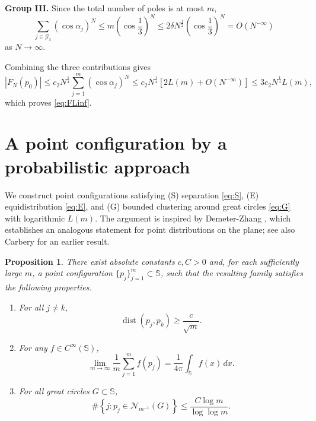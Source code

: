\documentclass[12pt,reqno]{amsart}
\DeclareMathOperator{\dist}{dist}
\newcommand{\Gc}{\mathcal{G}}
\newcommand{\Nc}{\mathcal{N}}
\newcommand{\Sb}{\mathbb{S}}
\theoremstyle{plain}
\newtheorem{prop}[thm]{Proposition}
\theoremstyle{definition}
\theoremstyle{remark}
\numberwithin{equation}{section}
\begin{document}
\textbf{Group III.} Since the total number of poles is at most $m$,
$$\sum_{j\in\Gc_3}\left(\cos\alpha_j\right)^N\le m\left(\cos\frac13\right)^N\le2\delta N^\frac12\left(\cos\frac13\right)^N=O\left(N^{-\infty}\right)$$
as $N\to\infty$.

Combining the three contributions gives
$$\left|F_N\left(p_0\right)\right|\le c_2N^\frac14\sum_{j=1}^m\left(\cos\alpha_j\right)^N\le c_2N^\frac14\left[2L(m)+O\left(N^{-\infty}\right)\right]\le 3c_2N^\frac14L(m),$$
which proves \eqref{eq:FLinf}.


\appendix
\section{A point configuration by a probabilistic approach}\label{sec:prob}
We construct point configurations satisfying (S) separation \eqref{eq:S}, (E) equidistribution \eqref{eq:E}, and (G) bounded clustering around great circles \eqref{eq:G} with logarithmic $L(m)$. The argument is inspired by Demeter-Zhang \cite[Proposition 2.1]{DZ}, which establishes an analogous statement for point distributions on the plane; see also Carbery \cite{C} for an earlier result.

\begin{prop}\label{prop:prob}
There exist absolute constants $c,C>0$ and, for each sufficiently large $m$, a point configuration $\{p_j\}_{j=1}^m\subset\Sb$, such that the resulting family satisfies the following properties.
\begin{enumerate}
\item[(S).] [Separation] For all $j\ne k$,
$$\dist\left(p_j,p_k\right)\ge\frac{c}{\sqrt m}.$$
\item[(E).] [Equidistribution] For any $f\in C^\infty(\Sb)$,
$$\lim_{m\to\infty}\frac1m\sum_{j=1}^mf\left(p_j\right)=\frac{1}{4\pi}\int_\Sb f(x)\,dx.$$
\item[(G).] [Bounded clustering around great circles] For all great circles $G\subset\Sb$,
$$\#\left\{j:p_j\in\Nc_{m^{-1}}(G)\right\}\le\frac{C\log m}{\log\log m}.$$
\end{enumerate}
\end{prop}
\end{document}
